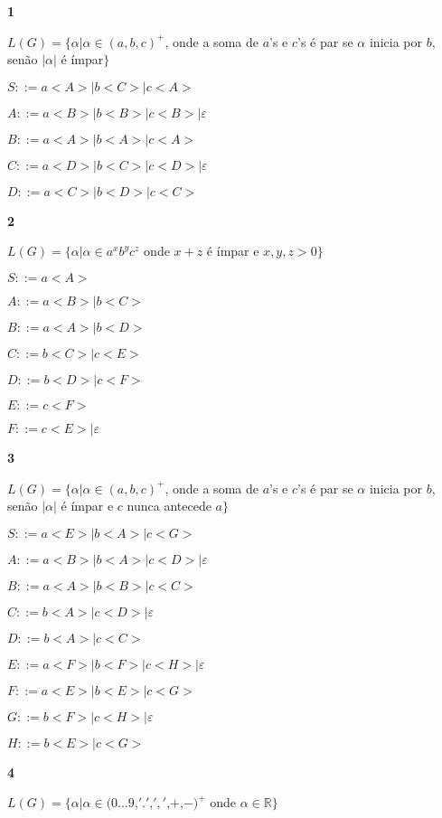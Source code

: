 \documentclass[ ]{article}
\begin{document}
\textbf{1}

	$L(G) = \{ \alpha | \alpha \in (a,b,c)^+$, onde a soma de $a$'s e $c$'s é par se $\alpha$ inicia por $b$, senão $|\alpha|$ é ímpar$\}$
	
	$S ::= a<A>| b<C> | c <A> $ %
	
	$A ::= a <B> | b<B> | c<B> | \varepsilon$ %
	
	$B ::= a <A> | b<A> | c<A>$
	
	$C ::= a<D> | b<C> | c<D> | \varepsilon$ %
	
	$D ::= a<C> | b<D> | c<C>$
	
	
\textbf{2}

	$L(G) = \{\alpha | \alpha \in a^x b^yc^z$ onde $x+z$ é ímpar e $x,y,z>0 \}$
	
	$S::= a <A>$
	
	$A::= a<B> |b<C>$ %
	
	$B::= a<A>| b<D>$ %
	
	$C::= b<C> | c<E> $ %
	
	$D::= b<D> | c<F> $ %
	
	$E::= c<F>$ %
	
	$F::= c<E> | \varepsilon$ %
	
\textbf{3}

	$L(G) = \{ \alpha | \alpha \in (a,b,c)^+$, onde a soma de $a$'s e $c$'s é par se $\alpha$ inicia por $b$, senão $|\alpha|$ é ímpar e $c$ nunca antecede $a\}$
	
	$S::= a<E> | b<A> | c<G>$
	
	$A::= a<B> | b<A> | c<D> | \varepsilon$ %
	
	$B::= a<A> |b<B> | c<C>$ %
	
	$C::= b<A>|c<D> | \varepsilon$%
	
	$D::= b<A>|c<C> $ %

	$E::= a<F> | b<F> | c<H> | \varepsilon$ %
	
	$F::= a<E> | b<E> | c<G>$ %
	
	$G::= b<F> | c<H>| \varepsilon$ %
	
	$H::= b<E> | c<G>$ %
	
	\textbf{4}
	
	$L(G) = \{ \alpha | \alpha \in (0$...$9$,$'.'$,$','$,$+$,$-)^+$ onde $\alpha \in \mathbb{R}\}
$
\end{document}
